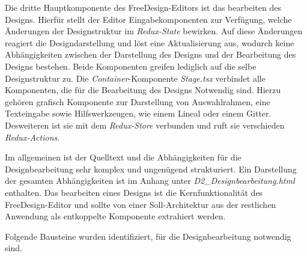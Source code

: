 Die dritte Hauptkomponente des FreeDesign-Editors ist das bearbeiten des Designs. Hierfür stellt der Editor Eingabekomponenten zur Verfügung, welche Änderungen der Designstruktur im \emph{Redux-State} bewirken. Auf diese Änderungen reagiert die Designdarstellung und löst eine Aktualisierung aus, wodurch keine Abhängigkeiten zwischen der Darstellung des Designs und der Bearbeitung des Designs bestehen. Beide Komponenten greifen lediglich auf die selbe Designstruktur zu.  
Die \emph{Container}-Komponente \emph{Stage.tsx} verbindet alle Komponenten, die für die Bearbeitung des Designs Notwendig sind. Hierzu gehören grafisch Komponente zur Darstellung von Auswahlrahmen, eine Texteingabe sowie Hilfswerkzeugen, wie einem Lineal oder einem Gitter. 
Desweiteren ist sie mit dem \emph{Redux-Store} verbunden und ruft sie verschieden \emph{Redux-Actions}. 

Im allgemeinen ist der Quelltext und die Abhängigkeiten für die Designbearbeitung sehr komplex und ungenügend strukturiert. 
Ein Darstellung der gesamten Abhängigkeiten ist im Anhang unter \emph{D2\_Designbearbeitung.html} enthalten.
Das bearbeiten eines Designs ist die Kernfunktionalität des FreeDesign-Editor und sollte von einer Soll-Architektur aus der restlichen Anwendung als entkoppelte Komponente extrahiert werden. 



Folgende Bausteine wurden identifiziert, für die Designbearbeitung notwendig sind.
\begin{multicols}{2}    
    
\end{multicols}
